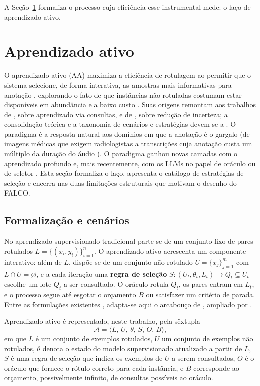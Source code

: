 A Seção~\ref{sec:fund-al} formaliza o processo cuja eficiência esse
instrumental mede: o laço de aprendizado ativo.

\section{Aprendizado ativo}
\label{sec:fund-al}

O aprendizado ativo (AA) maximiza a eficiência de rotulagem ao permitir que o
sistema selecione, de forma interativa, as amostras mais informativas para
anotação \cite{Settles2012}, explorando o fato de que instâncias não rotuladas
costumam estar disponíveis em abundância e a baixo custo \cite{Zhu2009}. Suas
origens remontam aos trabalhos de \citet{Angluin1988}, sobre aprendizado via
consultas, e de \citet{Cohn1994Improving}, sobre redução de incerteza; a
consolidação teórica e a taxonomia de cenários e estratégias devem-se a
\citet{Settles2012}. O paradigma é a resposta natural aos domínios em que a
anotação é o gargalo (de imagens médicas que exigem radiologistas a
transcrições cuja anotação custa um múltiplo da duração do áudio
\cite{Settles2012}). O paradigma ganhou novas camadas com o aprendizado
profundo \cite{Ren2021} e, mais recentemente, com os LLMs no papel de oráculo
ou de seletor \cite{Bayer2024ActiveLLM}. Esta seção formaliza o laço, apresenta o catálogo de
estratégias de seleção e encerra nas duas limitações estruturais que motivam o
desenho do FALCO.

\subsection{Formalização e cenários}
\label{sec:formalismo}

No aprendizado supervisionado tradicional parte-se de um conjunto fixo de
pares rotulados $L = \{(x_i,y_i)\}_{i=1}^{n}$. O aprendizado ativo acrescenta
um componente interativo: além de $L$, dispõe-se de um conjunto não rotulado
$U=\{x_j\}_{j=1}^{m}$ com $L\cap U=\varnothing$, e a cada iteração uma
\textbf{regra de seleção} $S:(U_t,\theta_t,L_t)\mapsto Q_t\subseteq U_t$
escolhe um lote $Q_t$ a ser consultado. O oráculo rotula $Q_t$, os pares
entram em $L_t$, e o processo segue até esgotar o orçamento $B$ ou satisfazer
um critério de parada. Entre as formulações existentes
\cite{Settles2012, Roy2001, Goudjil2018}, adapta-se aqui o arcabouço de \citet{Cohn1996}, ampliado por
\citet{Hanneke2015}.

\begin{definicao}
Aprendizado ativo é representado, neste trabalho, pela sêxtupla
\[
   \mathcal{A} = \langle L,\, U,\, \theta,\, S,\, O,\, B \rangle,
\]
em que $L$ é um conjunto de exemplos rotulados, $U$ um conjunto de exemplos
não rotulados, $\theta$ denota o estado do modelo supervisionado atualizado a
partir de $L$, $S$ é uma regra de seleção que indica os exemplos de $U$ a
serem consultados, $O$ é o oráculo que fornece o rótulo correto para cada
instância, e $B$ corresponde ao orçamento, possivelmente infinito, de consultas possíveis ao oráculo.
\end{definicao}

